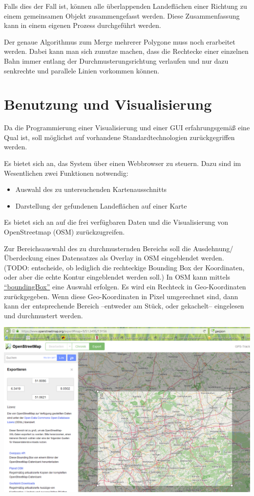 \documentclass[
11pt, %
a4paper, %
oneside, %
pdfspacing, %
headinclude,
BCOR5mm, %
ngerman, %
bibtotocnumbered,
]{scrartcl}
\begin{document}
Falls dies der Fall ist, können alle überlappenden Landeflächen einer Richtung zu einem gemeinsamen Objekt zusammengefasst werden. Diese Zusammenfassung kann in einem eigenen Prozess durchgeführt werden. 

Der genaue Algorithmus zum Merge mehrerer Polygone muss noch erarbeitet werden. Dabei kann man sich zunutze machen, dass die Rechtecke einer einzelnen Bahn immer entlang der Durchmusterungsrichtung verlaufen und nur dazu senkrechte und parallele Linien vorkommen können. 

\section{Benutzung und Visualisierung}

Da die Programmierung einer Visualisierung und einer GUI erfahrungsgemäß eine Qual ist, soll möglichst auf vorhandene Standardtechnologien zurückgegriffen werden.

Es bietet sich an, das System über einen Webbrowser zu steuern. Dazu sind im Wesentlichen zwei Funktionen notwendig:
\begin{itemize}
	\item Auswahl des zu untersuchenden Kartenausschnitts
	\item Darstellung der gefundenen Landeflächen auf einer Karte
\end{itemize}

Es bietet sich an auf die frei verfügbaren Daten und die Visualisierung von OpenStreetmap (OSM) zurückzugreifen. 

Zur Bereichsauswahl des zu durchmusternden Bereichs soll die Ausdehnung/Überdeckung eines Datensatzes als Overlay in OSM eingeblendet werden. (TODO: entscheide, ob lediglich die rechteckige Bounding Box der Koordinaten, oder aber die echte Kontur eingeblendet werden soll.)
In OSM kann mittels \href{http://wiki.openstreetmap.org/wiki/Bounding_Box}{"`boundingBox"'} eine Auswahl erfolgen. Es wird ein Rechteck in Geo-Koordinaten zurückgegeben. Wenn diese Geo-Koordinaten in Pixel umgerechnet sind, dann kann der entsprechende Bereich –entweder am Stück, oder gekachelt– eingelesen und durchmustert werden. 

\includegraphics[width=\textwidth]{./drawings/AuswahlKartenausschnitt.png}
\end{document}
